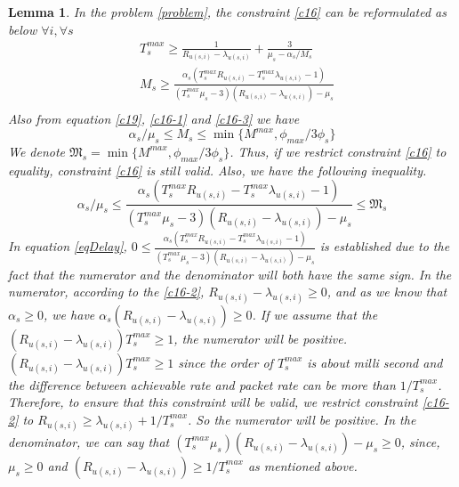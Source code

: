 \documentclass[conference]{IEEEtran}
\newtheorem{lemma}{Lemma}
\begin{document}
\begin{lemma}
In the problem \eqref{problem}, the constraint \eqref{c16} can be reformulated as below
$ \forall i,\forall s$
\begin{equation}
\begin{split}
&T^{max}_s \geq\frac{1}{R_{u(s,i)} - \lambda_{u(s,i)}} + \frac{3}{\mu_s - \alpha_{s}/{M_s}}  \\
&M_s \geq \frac{\alpha_s(T^{max}_s R_{u(s,i)}-T^{max}_s\lambda_{u(s,i)} -1)}{(T^{max}_s\mu_s-3)(R_{u(s,i)}-\lambda_{u(s,i)}) - \mu_s }\\
\end{split}
\end{equation}
Also from equation \eqref{c19}, \eqref{c16-1} and \eqref{c16-3} we have
\begin{equation}
\alpha_s/\mu_s\leq M_s \leq \min\{M^{max}, \phi_{max}/{3\phi_s}\}
\end{equation}
We denote $ \mathfrak{M}_s= \min\{M^{max}, \phi_{max}/{3\phi_s}\}$.
Thus, if we restrict constraint \eqref{c16} to equality, constraint \eqref{c16} is still valid.
Also, we have the following inequality.
\begin{equation}\label{eqDelay}
\alpha_s/\mu_s\leq \frac{\alpha_s(T^{max}_s R_{u(s,i)}-T^{max}_s\lambda_{u(s,i)} -1)}{(T^{max}_s\mu_s-3)(R_{u(s,i)}-\lambda_{u(s,i)}) - \mu_s } \leq \mathfrak{M}_s
\end{equation}
In equation \eqref{eqDelay}, $0\leq \frac{\alpha_s(T^{max}_s R_{u(s,i)}-T^{max}_s\lambda_{u(s,i)} -1)}{(T^{max}_s\mu_s-3)(R_{u(s,i)}-\lambda_{u(s,i)}) - \mu_s }$ is established due to the fact that 
the numerator and the denominator will both have the same sign.
In the numerator, according to the \eqref{c16-2}, $ R_{u(s,i)}-\lambda_{u(s,i)} \geq 0$, and as we know that $\alpha_s \geq 0$, we have $ \alpha_s (R_{u(s,i)}-\lambda_{u(s,i)}) \geq 0 $.
If we assume that the $(R_{u(s,i)}-\lambda_{u(s,i)})T^{max}_s \geq 1$, the numerator will be positive.
$(R_{u(s,i)}-\lambda_{u(s,i)})T^{max}_s \geq 1$ since the order of $T^{max}_s$ is about milli second and the difference between achievable rate and packet rate can be more than $1/T^{max}_s$.
Therefore, to ensure that this constraint will be valid, we restrict constraint \eqref{c16-2} to $R_{u(s,i)} \geq \lambda_{u(s,i)} + 1/T^{max}_s$.
So the numerator will be positive.
In the denominator, we can say that $(T^{max}_s\mu_s)(R_{u(s,i)}-\lambda_{u(s,i)}) - \mu_s \geq 0 $, since,  
$\mu_s \geq 0$ and
$(R_{u(s,i)}-\lambda_{u(s,i)}) \geq 1/T^{max}_s$ as mentioned above.


\end{lemma}
\end{document}
